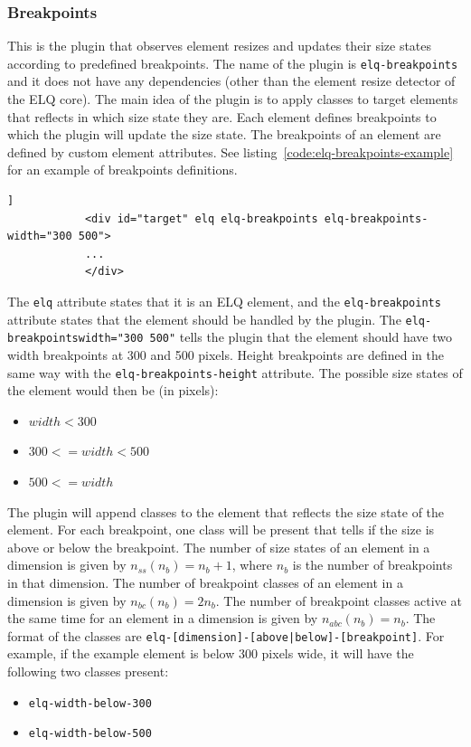 \documentclass[a4paper,11pt]{kth-mag}
\newcommand{\code}[1]{\texttt{#1}}
\begin{document}
        \subsubsection{Breakpoints}\label{sec:plugin-breakpoints}
          This is the plugin that observes element resizes and updates their size states according to predefined breakpoints.
          The name of the plugin is \code{elq-breakpoints} and it does not have any dependencies (other than the element resize detector of the \gls{ELQ} core).
          The main idea of the plugin is to apply classes to target elements that reflects in which size state they are.
          Each element defines breakpoints to which the plugin will update the size state.
          The breakpoints of an element are defined by custom element attributes.
          See listing~\ref{code:elq-breakpoints-example} for an example of breakpoints definitions.
          \begin{lstlisting}[gobble=12,caption={Example an \gls{HTML} element that uses the \code{elq-breakpoints} plugin.},captionpos=b,label={code:elq-breakpoints-example}]]
            <div id="target" elq elq-breakpoints elq-breakpoints-width="300 500">
            ...
            </div>
          \end{lstlisting}
          The \code{elq} attribute states that it is an \gls{ELQ} element, and the \code{elq-breakpoints} attribute states that the element should be handled by the plugin.
          The \code{elq-breakpoints\-width="300 500"} tells the plugin that the element should have two width breakpoints at 300 and 500 pixels.
          Height breakpoints are defined in the same way with the \code{elq-breakpoints-height} attribute.
          The possible size states of the element would then be (in pixels):
          \begin{itemize}
            \item $width < 300$
            \item $300 <= width < 500$
            \item $500 <= width$
          \end{itemize}
          The plugin will append classes to the element that reflects the size state of the element.
          For each breakpoint, one class will be present that tells if the size is above or below the breakpoint.
          The number of size states of an element in a dimension is given by $n_{ss}(n_b) = n_b + 1$, where $n_b$ is the number of breakpoints in that dimension.
          The number of breakpoint classes of an element in a dimension is given by $n_{bc}(n_{b}) = 2n_b$.
          The number of breakpoint classes active at the same time for an element in a dimension is given by $n_{abc}(n_{b}) = n_{b}$.
          The format of the classes are \code{elq-[dimension]-[above|below]-[breakpoint]}.
          For example, if the example element is below 300 pixels wide, it will have the following two classes present:
          \begin{itemize}
            \item \code{elq-width-below-300}
            \item \code{elq-width-below-500}
          \end{itemize}
\end{document}
